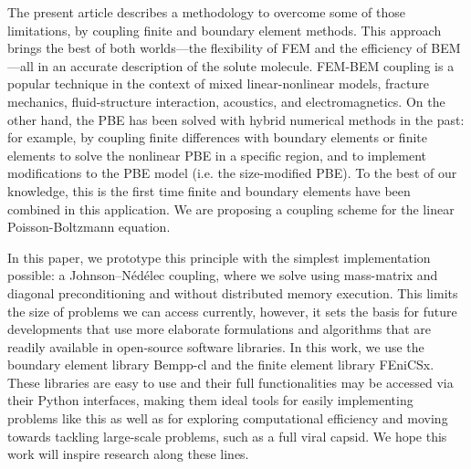 The present article describes a methodology to overcome some of those limitations, by coupling finite and boundary element methods.
This approach brings the best of both worlds---the flexibility of FEM and the efficiency of BEM---all in an accurate description of the solute molecule.
FEM-BEM coupling is a popular technique in the context of mixed linear-nonlinear models,\cite{carstensen1995coupling,aurada2013classical} fracture mechanics,\cite{aour2007coupled} fluid-structure interaction,\cite{estorff1991fem} acoustics,\cite{hiptmair2006stabilized} and electromagnetics.\cite{matsuoka1988calculation,hiptmair2008stabilized,bruckner20123d}
On the other hand, the PBE has been solved with hybrid numerical methods in the past: for example, by coupling finite differences with boundary elements\cite{boschitsch2004hybrid} or finite elements\cite{xie2016new,ying2018hybrid} to solve the nonlinear PBE in a specific region, and to implement modifications to the PBE model (i.e. the size-modified PBE).
To the best of our knowledge, this is the first time finite and boundary elements have been combined in this application. We are proposing a coupling scheme for the linear Poisson-Boltzmann equation.

In this paper, we prototype this principle with the simplest implementation possible: a Johnson--N\'ed\'elec\cite{johnson1980coupling} coupling, where we solve using mass-matrix and diagonal preconditioning and without distributed memory execution.
This limits the size of problems we can access currently, however, it sets the basis for future developments that use more elaborate formulations and algorithms that are readily available in open-source software libraries.
In this work, we use the boundary element library Bempp-cl\cite{BetckeScroggs2021} and the finite element library FEniCSx\cite{BasixJoss,BasixDofTransformations}.
These libraries are easy to use and their full functionalities may be accessed via their Python interfaces, making them ideal tools for easily implementing problems like this as well as for exploring computational efficiency and moving towards tackling large-scale problems, such as a full viral capsid.\cite{MartinezETal2019,wang2021high}
We hope this work will inspire research along these lines.
